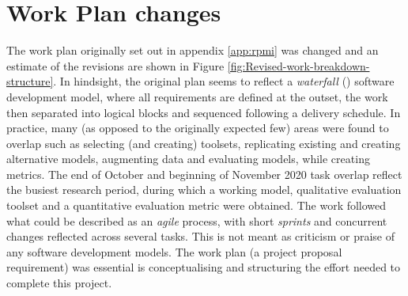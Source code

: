 \section{Work Plan changes}
The work plan originally set out in appendix \ref{app:rpmi} was changed and an estimate of the revisions are shown in Figure \ref{fig:Revised-work-breakdown-structure}. In hindsight, the original plan seems to reflect a \textit{waterfall} (\cite{balaji2012waterfall}) software development model, where all requirements are defined at the outset, the work then separated into logical blocks and sequenced following a delivery schedule. In practice, many (as opposed to the originally expected few) areas were found to overlap such as selecting (and creating) toolsets, replicating existing and creating alternative models, augmenting data and evaluating models, while creating metrics. The end of October and beginning of November 2020 task overlap reflect the busiest research period, during which a working model, qualitative evaluation toolset and a quantitative evaluation metric were obtained. The work followed what could be described as an \textit{agile} process, with short \textit{sprints} and concurrent changes reflected across several tasks. This is not meant as criticism or praise of any software development models. The work plan (a project proposal requirement) was essential is conceptualising and structuring the effort needed to complete this project.


